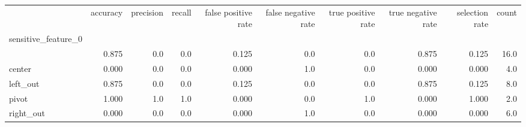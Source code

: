 \begin{tabular}{lrrrrrrrrr}
\toprule
{} &  accuracy &  precision &  recall &  false positive rate &  false negative rate &  true positive rate &  true negative rate &  selection rate &  count \\
sensitive\_feature\_0 &           &            &         &                      &                      &                     &                     &                 &        \\
\midrule
                    &     0.875 &        0.0 &     0.0 &                0.125 &                  0.0 &                 0.0 &               0.875 &           0.125 &   16.0 \\
center              &     0.000 &        0.0 &     0.0 &                0.000 &                  1.0 &                 0.0 &               0.000 &           0.000 &    4.0 \\
left\_out            &     0.875 &        0.0 &     0.0 &                0.125 &                  0.0 &                 0.0 &               0.875 &           0.125 &    8.0 \\
pivot               &     1.000 &        1.0 &     1.0 &                0.000 &                  0.0 &                 1.0 &               0.000 &           1.000 &    2.0 \\
right\_out           &     0.000 &        0.0 &     0.0 &                0.000 &                  1.0 &                 0.0 &               0.000 &           0.000 &    6.0 \\
\bottomrule
\end{tabular}

